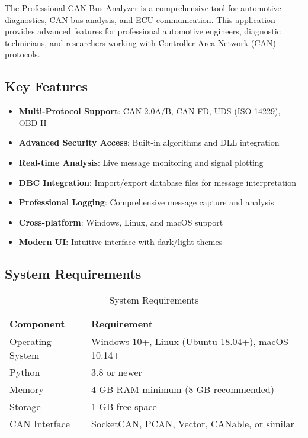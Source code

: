 \documentclass[11pt,a4paper]{article}
\begin{document}
The Professional CAN Bus Analyzer is a comprehensive tool for automotive diagnostics, CAN bus analysis, and ECU communication. This application provides advanced features for professional automotive engineers, diagnostic technicians, and researchers working with Controller Area Network (CAN) protocols.

\subsection{Key Features}

\begin{itemize}[label=\textcolor{canblue}{}]
    \item \textbf{Multi-Protocol Support}: CAN 2.0A/B, CAN-FD, UDS (ISO 14229), OBD-II
    \item \textbf{Advanced Security Access}: Built-in algorithms and DLL integration
    \item \textbf{Real-time Analysis}: Live message monitoring and signal plotting
    \item \textbf{DBC Integration}: Import/export database files for message interpretation
    \item \textbf{Professional Logging}: Comprehensive message capture and analysis
    \item \textbf{Cross-platform}: Windows, Linux, and macOS support
    \item \textbf{Modern UI}: Intuitive interface with dark/light themes
\end{itemize}

\subsection{System Requirements}

\begin{table}[h]
\centering
\begin{tabular}{@{}ll@{}}
\toprule
\textbf{Component} & \textbf{Requirement} \\
\midrule
Operating System & Windows 10+, Linux (Ubuntu 18.04+), macOS 10.14+ \\
Python & 3.8 or newer \\
Memory & 4 GB RAM minimum (8 GB recommended) \\
Storage & 1 GB free space \\
CAN Interface & SocketCAN, PCAN, Vector, CANable, or similar \\
\bottomrule
\end{tabular}
\caption{System Requirements}
\end{table}
\end{document}
